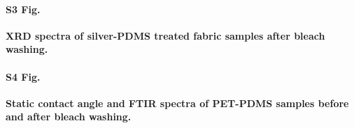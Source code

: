 \documentclass[10pt,letterpaper]{article}
\begin{document}
\paragraph*{S3 Fig.}
\label{S3_Fig}
{\bf XRD spectra of silver-PDMS treated fabric samples after bleach washing.}

\paragraph*{S4 Fig.}
\label{S4_Fig}
{\bf Static contact angle and FTIR spectra of PET-PDMS samples before and after bleach washing.}



\end{document}
